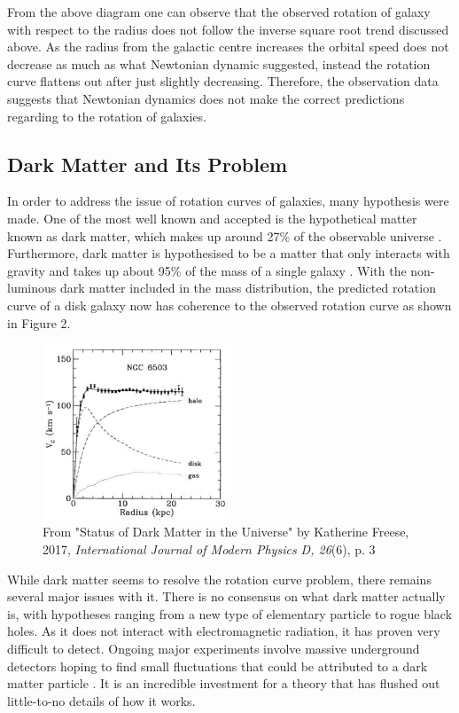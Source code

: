 \documentclass[11pt, twocolumn]{article}
\begin{document}
    From the above diagram one can observe that the observed rotation of galaxy with respect to the radius does not follow the inverse square root trend discussed above. As the radius from the galactic centre increases the orbital speed does not decrease as much as what Newtonian dynamic suggested, instead the rotation curve flattens out after just slightly decreasing. Therefore, the observation data suggests that Newtonian dynamics does not make the correct predictions regarding to the rotation of galaxies.

    \subsection*{Dark Matter and Its Problem}
    In order to address the issue of rotation curves of galaxies, many hypothesis were made. One of the most well known and accepted is the hypothetical matter known as dark matter, which makes up around 27\% of the observable universe \parencite{noauthor_dark_nodate}. 
    Furthermore, dark matter is hypothesised to be a matter that only interacts with gravity and takes up about 95\% of the mass of a single galaxy \parencite{freese_status_2017}.
    With the non-luminous dark matter included in the mass distribution, the predicted rotation curve of a disk galaxy now has coherence to the observed rotation curve as shown in Figure 2.
    \begin{figure}[h]
        \includegraphics[width=0.5\textwidth]{images/dark_matter_rotation_curve.jpg}
        \caption{From "Status of Dark Matter in the Universe" by Katherine Freese, 2017, \textit{International Journal of Modern Physics D, 26}(6), p. 3}
        \label{fig:dm_rotation}
    \end{figure}
    While dark matter seems to resolve the rotation curve problem, there remains several major issues with it. There is no consensus on what dark matter actually is, with hypotheses ranging from a new type of elementary particle to rogue black holes. As it does not interact with electromagnetic radiation, it has proven very difficult to detect. Ongoing major experiments involve massive underground detectors hoping to find small fluctuations that could be attributed to a dark matter particle \parencite{toomey_new_2020}. It is an incredible investment for a theory that has flushed out little-to-no details of how it works.
    
\end{document}
